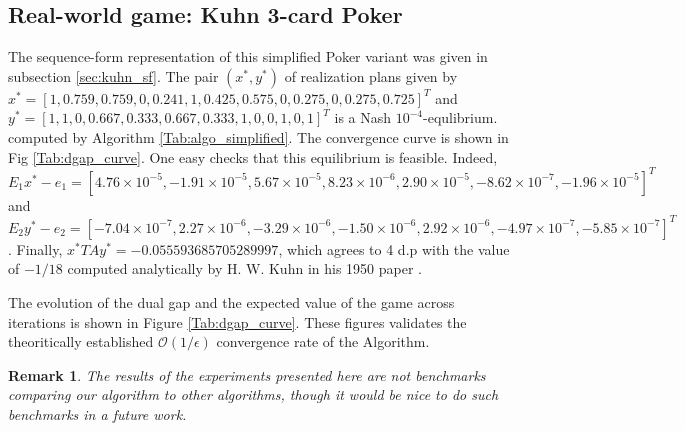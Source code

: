 \documentclass{article} %
\newtheorem{remark}{Remark}
\begin{document}
\subsection{Real-world game: Kuhn 3-card Poker}
The sequence-form representation of this simplified Poker variant was given in subsection \ref{sec:kuhn_sf}. The pair $(x^*, y^*)$ of realization plans given by
$x^* = [1, 0.759, 0.759, 0, 0.241, 1, 0.425, 0.575, 0, 0.275, 0, 0.275, 0.725]^T$ and
$y^* = [1, 1, 0, 0.667, 0.333, 0.667, 0.333, 1, 0, 0, 1, 0, 1]^T$ is a Nash $10^{-4}$-equlibrium.
computed by Algorithm  \ref{Tab:algo_simplified}. The convergence curve is shown in Fig \ref{Tab:dgap_curve}. One easy checks that this equilibrium is feasible. Indeed,  $E_1x^* - e_1 = [4.76 \times 10^{-5}, -1.91 \times 10^{-5}, 5.67 \times 10^{-5}, 8.23 \times 10^{-6}, 2.90 \times 10^{-5}, -8.62 \times 10^{-7}, -1.96 \times 10^{-5}]^T$ and $E_2y^* - e_2 = [-7.04 \times 10^{-7}, 2.27 \times 10^{-6}, -3.29 \times 10^{-6}, -1.50 \times 10^{-6}, 2.92 \times 10^{-6}, -4.97 \times 10^{-7}, -5.85 \times 10^{-7}]^T$. Finally, $x^*TAy^* = -0.055593685705289997$, which agrees to 4 d.p with the value of $-1 / 18$ computed analytically by H. W. Kuhn in his 1950 paper \cite{kuhn}.

The evolution of the dual gap and the expected value of the game across iterations is shown in Figure \ref{Tab:dgap_curve}. These figures validates the theoritically established $\mathcal{O}(1/\epsilon)$ convergence rate of the Algorithm.

\begin{remark}
The results of the experiments presented here are not benchmarks comparing our algorithm to other algorithms, though it would be nice to do such benchmarks in a future work.
\end{remark}
\end{document}
